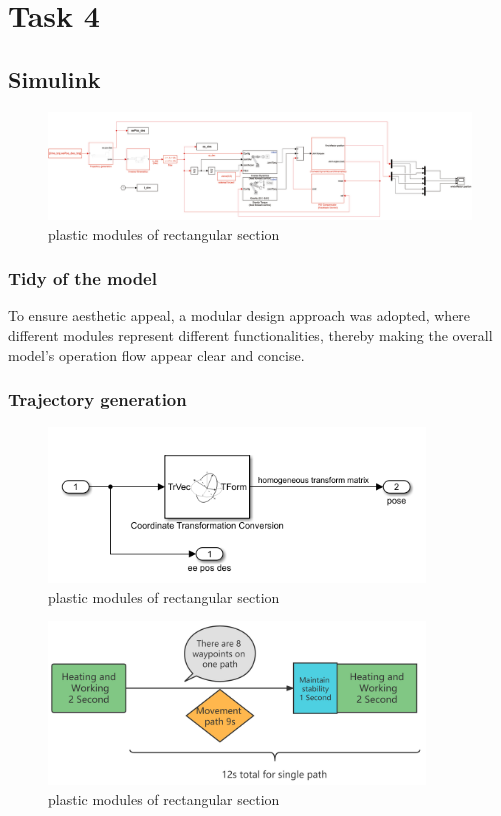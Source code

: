 \section{Task 4}
\FloatBarrier %


\subsection{Simulink}

\begin{figure}[htbp]
    \centering
    \includegraphics[width=17cm]{./fig/sim.jpg}
    \caption{plastic modules of rectangular section  }
    \label{f1}
\end{figure}

\subsubsection*{Tidy of the model}
To ensure aesthetic appeal, a modular design approach was adopted, where different modules represent different functionalities, thereby making the overall model's operation flow appear clear and concise.

\subsubsection*{Trajectory generation}

\begin{figure}[htbp]
    \centering
    \includegraphics[width=10cm]{./fig/traj.png}
    \caption{plastic modules of rectangular section  }
    \label{f1}
\end{figure}

\begin{figure}[htbp]
    \centering
    \includegraphics[width=10cm]{./fig/siwei.png}
    \caption{plastic modules of rectangular section  }
    \label{f1}
\end{figure}

